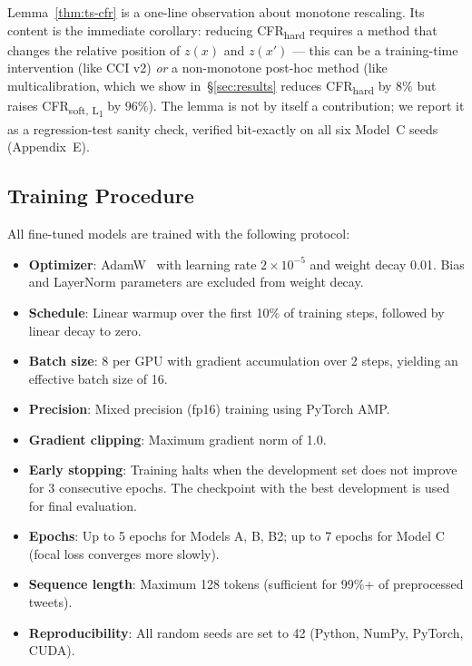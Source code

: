 Lemma~\ref{thm:ts-cfr} is a one-line observation about monotone rescaling. Its content is the immediate corollary: reducing CFR\textsubscript{hard} requires a method that changes the relative position of $z(x)$ and $z(x')$ --- this can be a training-time intervention (like CCI v2) \emph{or} a non-monotone post-hoc method (like multicalibration, which we show in~\S\ref{sec:results} reduces CFR\textsubscript{hard} by $8\%$ but raises CFR\textsubscript{soft, L\textsubscript{1}} by $96\%$). The lemma is not by itself a contribution; we report it as a regression-test sanity check, verified bit-exactly on all six Model~C seeds (Appendix~E).

\subsection{Training Procedure}
\label{sec:training}

All fine-tuned models are trained with the following protocol:
\begin{itemize}[leftmargin=*,itemsep=1pt]
    \item \textbf{Optimizer}: AdamW~\citep{loshchilov2019adamw} with learning rate $2 \times 10^{-5}$ and weight decay 0.01. Bias and LayerNorm parameters are excluded from weight decay.
    \item \textbf{Schedule}: Linear warmup over the first 10\% of training steps, followed by linear decay to zero.
    \item \textbf{Batch size}: 8 per GPU with gradient accumulation over 2 steps, yielding an effective batch size of 16.
    \item \textbf{Precision}: Mixed precision (fp16) training using PyTorch AMP.
    \item \textbf{Gradient clipping}: Maximum gradient norm of 1.0.
    \item \textbf{Early stopping}: Training halts when the development set \fone{} does not improve for 3 consecutive epochs. The checkpoint with the best development \fone{} is used for final evaluation.
    \item \textbf{Epochs}: Up to 5 epochs for Models A, B, B2; up to 7 epochs for Model C (focal loss converges more slowly).
    \item \textbf{Sequence length}: Maximum 128 tokens (sufficient for 99\%+ of preprocessed tweets).
    \item \textbf{Reproducibility}: All random seeds are set to 42 (Python, NumPy, PyTorch, CUDA).
\end{itemize}

